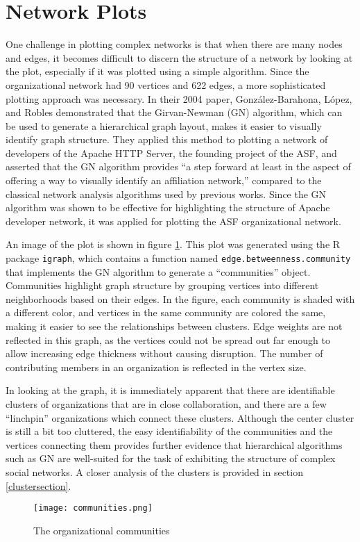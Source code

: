 \section{Network Plots}
One challenge in plotting complex networks is that when there are many nodes and edges, it becomes difficult to discern the structure of a network by looking at the plot, especially if it was plotted using a simple algorithm. Since the organizational network had 90 vertices and 622 edges, a more sophisticated plotting approach was necessary. In their 2004 paper\cite{gonzalez2004community}, Gonz{\'a}lez-Barahona, L{\'o}pez, and Robles demonstrated that the Girvan-Newman (GN) algorithm, which can be used to generate a hierarchical graph layout, makes it easier to visually identify graph structure. They applied this method to plotting a network of developers of the Apache HTTP Server, the founding project of the ASF, and asserted that the GN algorithm provides ``a step forward at least in the aspect of offering a way to visually identify an affiliation network,'' compared to the classical network analysis algorithms used by previous works. Since the GN algorithm was shown to be effective for highlighting the structure of Apache developer network, it was applied for plotting the ASF organizational network.

An image of the plot is shown in figure \ref{fig:orgCommunities}. This plot was generated using the R package \verb|igraph|, which contains a function named \verb|edge.betweenness.community| that implements the GN algorithm to generate a ``communities'' object. Communities highlight graph structure by grouping vertices into different neighborhoods based on their edges. In the figure, each community is shaded with a different color, and vertices in the same community are colored the same, making it easier to see the relationships between clusters. Edge weights are not reflected in this graph, as the vertices could not be spread out far enough to allow increasing edge thickness without causing disruption. The number of contributing members in an organization is reflected in the vertex size.

In looking at the graph, it is immediately apparent that there are identifiable clusters of organizations that are in close collaboration, and there are a few ``linchpin'' organizations which connect these clusters. Although the center cluster is still a bit too cluttered, the easy identifiability of the communities and the vertices connecting them provides further evidence that hierarchical algorithms such as GN are well-suited for the task of exhibiting the structure of complex social networks. A closer analysis of the clusters is provided in section \ref{clustersection}.
\begin{figure}
	\texttt{[image: communities.png]}
	\centering
	\caption{The organizational communities}
	\label{fig:orgCommunities}
\end{figure}


